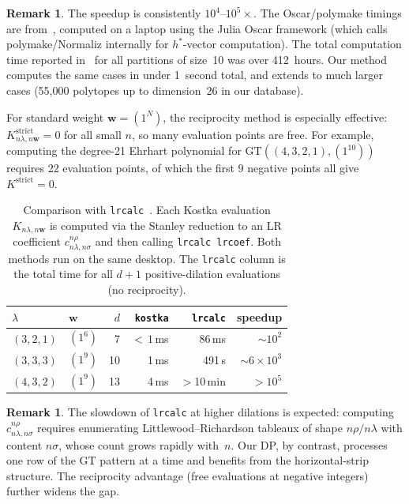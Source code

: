 \documentclass[11pt,reqno]{amsart}
\theoremstyle{definition}
\newtheorem{remark}[theorem]{Remark}
\newcommand{\GT}{\mathrm{GT}}
\newcommand{\lam}{\lambda}
\newcommand{\wt}{\mathbf{w}}
\begin{document}
\begin{remark}\label{rem:speedup}
The speedup is consistently $10^4$--$10^5 \times$.
The Oscar/polymake timings are from~\cite{OskarThesis},
computed on a laptop using the Julia Oscar framework
(which calls polymake/Normaliz internally for $h^*$-vector computation).
The total computation time reported in~\cite{OskarThesis} for all
partitions of size~10 was over 412~hours.  Our method computes the same
cases in under 1~second total, and extends to much larger cases
(55{,}000 polytopes up to dimension~26 in our database).

For standard weight $\wt = (1^N)$, the reciprocity method is especially
effective: $K^{\mathrm{strict}}_{n\lam, n\wt} = 0$ for all small $n$,
so many evaluation points are free.  For example, computing the
degree-21 Ehrhart polynomial for $\GT((4,3,2,1), (1^{10}))$ requires
22 evaluation points, of which the first 9 negative points all give
$K^{\mathrm{strict}} = 0$.
\end{remark}

\begin{table}[!ht]
\centering
\caption{%
  Comparison with \texttt{lrcalc}~\cite{Buch2000}.
  Each Kostka evaluation $K_{n\lam, n\wt}$ is computed via the
  Stanley reduction to an LR coefficient $c^{n\rho}_{n\lam, n\sigma}$
  and then calling \texttt{lrcalc lrcoef}.  Both methods run on the
  same desktop.  The \texttt{lrcalc} column is the total time for
  all $d+1$ positive-dilation evaluations (no reciprocity).
}
\label{tab:lrcalc}
\begin{tabular*}{\textwidth}{@{\extracolsep{\fill}}llrrrr@{}}
\toprule
$\lam$ & $\wt$ & $d$ & \texttt{kostka} & \texttt{lrcalc} & speedup \\
\midrule
$(3,2,1)$   & $(1^6)$  &  7 & ${<}\,1$\,ms & 86\,ms    & $\sim\!10^2$ \\
$(3,3,3)$   & $(1^9)$  & 10 & 1\,ms         & 491\,s    & $\sim\!6 \times 10^3$ \\
$(4,3,2)$   & $(1^9)$  & 13 & 4\,ms         & $>\!$10\,min & $>\!10^5$ \\
\bottomrule
\end{tabular*}
\end{table}

\begin{remark}\label{rem:lrcalcSlowdown}
The slowdown of \texttt{lrcalc} at higher dilations is expected:
computing $c^{n\rho}_{n\lam, n\sigma}$ requires enumerating
Littlewood--Richardson tableaux of shape $n\rho / n\lam$ with
content $n\sigma$, whose count grows rapidly with~$n$.  Our DP, by
contrast, processes one row of the GT pattern at a time and benefits
from the horizontal-strip structure.  The reciprocity advantage
(free evaluations at negative integers) further widens the gap.
\end{remark}
\end{document}
